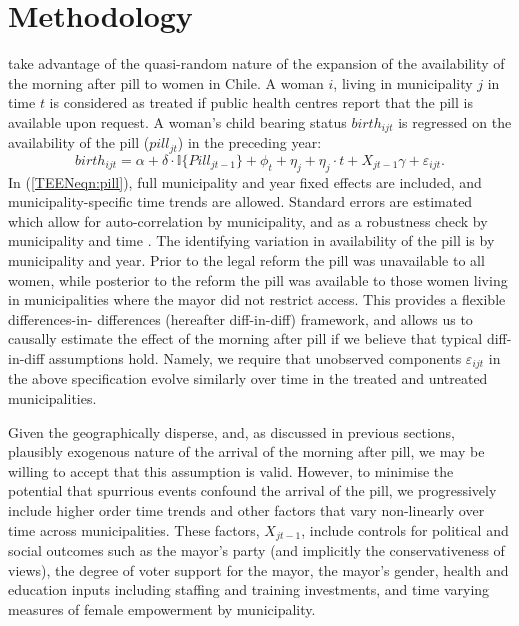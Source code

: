 \section{Methodology}
\label{TEENscn:ID}
\Person take advantage of the quasi-random nature of the expansion of the 
availability of the morning after pill to women in Chile.  A woman $i$, living
in municipality $j$ in time $t$ is considered as treated if public health 
centres report that the pill is available upon request.  A woman's child 
bearing status $birth_{ijt}$ is regressed on the availability of the pill 
($pill_{jt}$) in the preceding year:
\begin{equation}
 \label{TEENeqn:pill}
birth_{ijt} = \alpha + \delta\cdot \mathbb{I}\{Pill_{jt-1}\} + \phi_t + \eta_j + 
\eta_j\cdot t + X_{jt-1}\gamma + \varepsilon_{ijt}.
\end{equation}
In (\ref{TEENeqn:pill}), full municipality and year fixed effects are included,
and municipality-specific time trends are allowed.  Standard errors are 
estimated which allow for auto-correlation by municipality, and as a robustness
check by municipality and time \citep{Cameronetal2008}.  The identifying 
variation in availability of the pill is by municipality and year.  Prior to 
the legal reform the pill was unavailable to all women, while posterior to the
reform the pill was available to those women living in municipalities where the
mayor did not restrict access.  This provides a flexible differences-in-%
differences (hereafter diff-in-diff) framework, and allows us to causally 
estimate the effect of the morning after pill if we believe that typical 
diff-in-diff assumptions hold.  Namely, we require that unobserved components 
$\varepsilon_{ijt}$ in the above specification evolve similarly over time in 
the treated and untreated municipalities.

Given the geographically disperse, and, as discussed in previous sections,
plausibly exogenous nature of the arrival of the morning after pill, we may be
willing to accept that this assumption is valid.  However, to minimise the 
potential that spurrious events confound the arrival of the pill, we 
progressively include higher order time trends and other factors that vary 
non-linearly over time across municipalities.  These factors, $X_{jt-1}$, 
include controls for political and social outcomes such as the mayor's party
(and implicitly the conservativeness of views), the degree of voter support for
the mayor, the mayor's gender, health and education inputs including staffing
and training investments, and time varying measures of female empowerment by
municipality.

